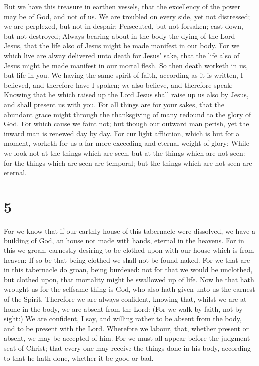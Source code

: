  But we have this treasure in earthen vessels, that the
excellency of the power may be of God, and not of us.  We
are troubled on every side, yet not distressed; we are perplexed, but
not in despair;  Persecuted, but not forsaken; cast down,
but not destroyed;  Always bearing about in the body the
dying of the Lord Jesus, that the life also of Jesus might be made
manifest in our body.  For we which live are alway
delivered unto death for Jesus' sake, that the life also of Jesus might
be made manifest in our mortal flesh.  So then death
worketh in us, but life in you.  We having the same
spirit of faith, according as it is written, I believed, and therefore
have I spoken; we also believe, and therefore speak; 
Knowing that he which raised up the Lord Jesus shall raise up us also by
Jesus, and shall present us with you.  For all things are
for your sakes, that the abundant grace might through the thanksgiving
of many redound to the glory of God.  For which cause we
faint not; but though our outward man perish, yet the inward man is
renewed day by day.  For our light affliction, which is
but for a moment, worketh for us a far more exceeding and eternal weight
of glory;  While we look not at the things which are
seen, but at the things which are not seen: for the things which are
seen are temporal; but the things which are not seen are eternal.

\hypertarget{section-4}{%
\section{5}\label{section-4}}

 For we know that if our earthly house of this tabernacle
were dissolved, we have a building of God, an house not made with hands,
eternal in the heavens.  For in this we groan, earnestly
desiring to be clothed upon with our house which is from heaven:
 If so be that being clothed we shall not be found naked.
 For we that are in this tabernacle do groan, being
burdened: not for that we would be unclothed, but clothed upon, that
mortality might be swallowed up of life.  Now he that hath
wrought us for the selfsame thing is God, who also hath given unto us
the earnest of the Spirit.  Therefore we are always
confident, knowing that, whilst we are at home in the body, we are
absent from the Lord:  (For we walk by faith, not by
sight:)  We are confident, I say, and willing rather to be
absent from the body, and to be present with the Lord. 
Wherefore we labour, that, whether present or absent, we may be accepted
of him.  For we must all appear before the judgment seat
of Christ; that every one may receive the things done in his body,
according to that he hath done, whether it be good or bad.

